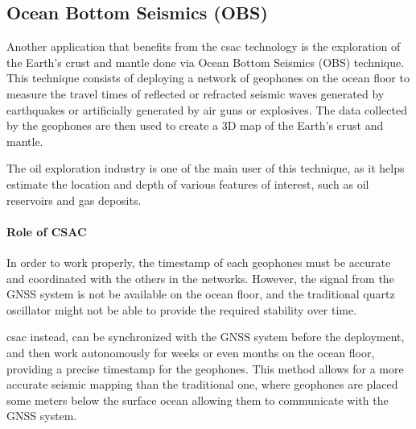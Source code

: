 \subsection{Ocean Bottom Seismics (OBS)}
\label{subsec:OBS}

Another application that benefits from the \acrshort{csac} technology is the exploration of the Earth's crust and mantle done via Ocean Bottom Seismics (OBS) technique.
This technique consists of deploying a network of geophones on the ocean floor to measure the travel times of reflected or refracted seismic waves generated by earthquakes or artificially generated by air guns or explosives.
The data collected by the geophones are then used to create a 3D map of the Earth's crust and mantle.

The oil exploration industry is one of the main user of this technique, as it helps estimate the location and depth of various features of interest, such as oil reservoirs and gas deposits.


\paragraph{Role of CSAC}

In order to work properly, the timestamp of each geophones must be accurate and coordinated with the others in the networks.
However, the signal from the GNSS system is not be available on the ocean floor, and the traditional quartz oscillator might not be able to provide the required stability over time.

\acrshort{csac} instead, can be synchronized with the GNSS system before the deployment, and then work autonomously for weeks or even months on the ocean floor, providing a precise timestamp for the geophones.
This method allows for a more accurate seismic mapping than the traditional one, where geophones are placed some meters below the surface ocean allowing them to communicate with the GNSS system.
